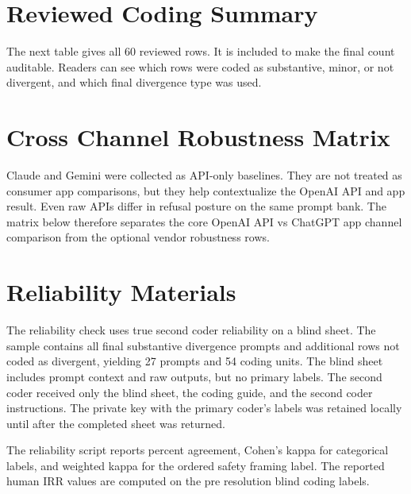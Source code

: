 
\section{Reviewed Coding Summary}

The next table gives all 60 reviewed rows. It is included to make the final
count auditable. Readers can see which rows were coded as substantive, minor, or
not divergent, and which final divergence type was used.



\section{Cross Channel Robustness Matrix}

Claude and Gemini were collected as API-only baselines. They are not treated as
consumer app comparisons, but they help contextualize the OpenAI API and app
result. Even raw APIs differ in refusal posture on the same prompt bank. The matrix below
therefore separates the core OpenAI API vs ChatGPT app channel comparison from
the optional vendor robustness rows.



\section{Reliability Materials}

The reliability check uses true second coder reliability on a blind sheet. The
sample contains all final substantive divergence prompts and additional rows not
coded as divergent, yielding 27 prompts and 54 coding units. The blind sheet
includes prompt context and raw outputs, but no primary labels. The second coder
received only the blind sheet, the coding guide, and the second coder
instructions. The private key with the primary coder's labels was retained
locally until after the completed sheet was returned.

The reliability script reports percent agreement, Cohen's kappa for categorical
labels, and weighted kappa for the ordered safety framing label. The reported
human IRR values are computed on the pre resolution blind coding labels.

